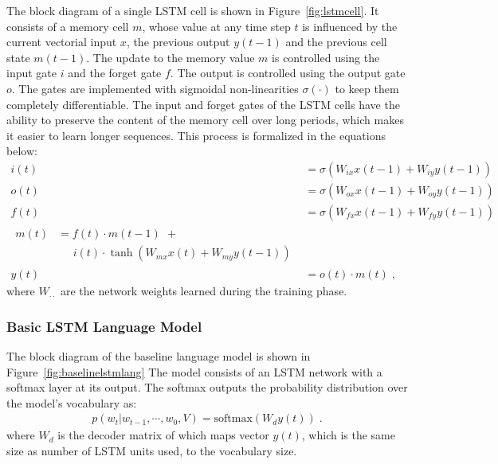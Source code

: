 The block diagram of a single LSTM cell is shown in Figure~\ref{fig:lstmcell}.  
It consists of a memory cell $m$, whose value at any time step $t$ is influenced
by the current vectorial input $x$, the previous output $y(t-1)$ and the
previous cell state $m(t-1)$.
The update to the memory value $m$ is controlled using the input gate $i$ and
the forget gate $f$.
The output is controlled using the output gate $o$. 
The gates are implemented with sigmoidal non-linearities $\sigma(\cdot)$ to keep
them completely differentiable.
The input and forget gates of the LSTM cells have the ability to preserve the
content of the memory cell over long periods, which makes it easier to learn
longer sequences.
This process is formalized in the equations below:
\begin{align}
  \label{eqn:lstmstrt}
  i(t) &= \sigma(W_{ix}x(t-1) + W_{iy}y(t-1))\\
  o(t) &= \sigma(W_{ox}x(t-1) + W_{oy}y(t-1))\\
  f(t) &= \sigma(W_{fx}x(t-1) + W_{fy}y(t-1))\\
  \label{eqn:lstmend}
  \begin{split}
    m(t) &= f(t)\cdot m(t-1) \:\, + \\
    &\; \; \; \; \; i(t)\cdot \tanh(W_{mx}x(t)+W_{my}y(t-1))
  \end{split}\\
  y(t) &= o(t) \cdot m(t) \;,
\end{align}
where $W_{\cdot\cdot}$ are the network weights learned during the
training phase.


\subsubsection{Basic LSTM Language Model}
\label{subsec:basiclstmodel}

The block diagram of the baseline language model is shown in
Figure~\ref{fig:baselinelstmlang}
The model consists of an LSTM network with a softmax layer at its output. 
The softmax outputs the probability distribution over the model's vocabulary as:
\begin{align}
p(w_t | w_{t-1},\cdots,w_0, V) = \text{softmax}(W_d y(t)) \;.
\end{align}
\noindent where $W_d$ is the decoder matrix of which maps vector $y(t)$, which
is the same size as number of LSTM units used, to the vocabulary size.

